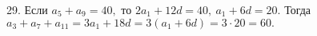 29. Если $a_5+a_9=40,$ то $2a_1+12d=40,\ a_1+6d=20.$ Тогда $a_3+a_7+a_{11}=3a_1+18d=3(a_1+6d)=3\cdot20=60.$\\
